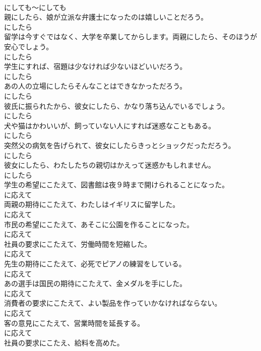 \documentclass[8pt]{extreport}
\begin{document}
\begin{CJK}{UTF8}{min}
\\	にしても～にしても
\\	親にしたら、娘が立派な弁護士になったのは嬉しいことだろう。	
\\	にしたら
\\	留学は今すぐではなく、大学を卒業してからします。両親にしたら、そのほうが安心でしょう。	
\\	にしたら
\\	学生にすれば、宿題は少なければ少ないほどいいだろう。	
\\	にしたら
\\	あの人の立場にしたらそんなことはできなかっただろう。	
\\	にしたら
\\	彼氏に振られたから、彼女にしたら、かなり落ち込んでいるでしょう。	
\\	にしたら
\\	犬や猫はかわいいが、飼っていない人にすれば迷惑なこともある。	
\\	にしたら
\\	突然父の病気を告げられて、彼女にしたらきっとショックだっただろう。	
\\	にしたら
\\	彼女にしたら、わたしたちの親切はかえって迷惑かもしれません。	
\\	にしたら
\\	学生の希望にこたえて、図書館は夜９時まで開けられることになった。	
\\	に応えて
\\	両親の期待にこたえて、わたしはイギリスに留学した。	
\\	に応えて
\\	市民の希望にこたえて、あそこに公園を作ることになった。	
\\	に応えて
\\	社員の要求にこたえて、労働時間を短縮した。	
\\	に応えて
\\	先生の期待にこたえて、必死でピアノの練習をしている。	
\\	に応えて
\\	あの選手は国民の期待にこたえて、金メダルを手にした。	
\\	に応えて
\\	消費者の要求にこたえて、よい製品を作っていかなければならない。	
\\	に応えて
\\	客の意見にこたえて、営業時間を延長する。	
\\	に応えて
\\	社員の要求にこたえ、給料を高めた。	

\end{CJK}
\end{document}
